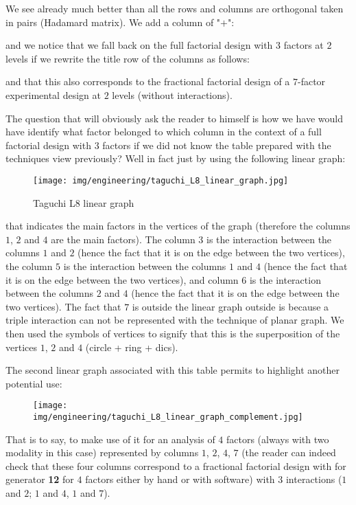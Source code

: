 	We see already much better than all the rows and columns are orthogonal taken in pairs (Hadamard matrix). We add a column of "$+$":
	
	and we notice that we fall back on the full factorial design with $3$ factors at $2$ levels if we rewrite the title row of the columns as follows:
	
	and that this also corresponds to the fractional factorial design of a $7$-factor experimental design at $2$ levels (without interactions).
	
	The question that will obviously ask the reader to himself is how we have would have identify what factor belonged to which column in the context of a full factorial design with $3$ factors if we did not know the table prepared with the techniques view previously? Well  in fact just by using the following linear graph:
	\begin{figure}[H]
		\begin{center}
		\texttt{[image: img/engineering/taguchi\_L8\_linear\_graph.jpg]}
		\caption{Taguchi L8 linear graph}
		\end{center}	
	\end{figure}
	that indicates the main factors in the vertices of the graph (therefore the columns $1$, $2$ and $4$ are the main factors). The column $3$ is the interaction between the columns $1$ and $2$ (hence the fact that it is on the edge between the two vertices), the column $5$ is the interaction between the columns $1$ and $4$ (hence the fact that it is on the edge between the two vertices), and column $6$ is the interaction between the columns $2$ and $4$ (hence the fact that it is on the edge between the two vertices). The fact that $7$ is outside the linear graph outside is because a triple interaction can not be represented with the technique of planar graph. We then used the symbols of vertices to signify that this is the superposition of the vertices $1$, $2$ and $4$ (circle + ring + dics).

	The second linear graph associated with this table permits to highlight another potential use:
	\begin{figure}[H]
		\begin{center}
		\texttt{[image: img/engineering/taguchi\_L8\_linear\_graph\_complement.jpg]}
		\end{center}	
	\end{figure}
	That is to say, to make use of it for an analysis of $4$ factors (always with two modality in this case) represented by columns $1$, $2$, $4$, $7$ (the reader can indeed check that these four columns correspond to a fractional factorial design with for generator \textbf{12} for $4$ factors either by hand or with software) with $3$ interactions ($1$ and $2$; $1$ and $4$, $1$ and $7$).
	
